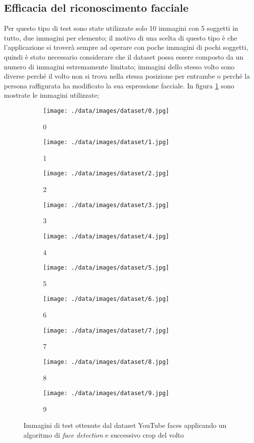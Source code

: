 \subsection{Efficacia del riconoscimento facciale}
Per questo tipo di test sono state utilizzate solo 10 immagini con 5 soggetti in tutto, due immagini per elemento; il motivo di una scelta di questo tipo è che l'applicazione si troverà sempre ad operare con poche immagini di pochi soggetti, quindi è stato necessario considerare che il dataset possa essere composto da un numero di immagini estremamente limitato; immagini dello stesso volto sono diverse perché il volto non si trova nella stessa posizione per entrambe o perché la persona raffigurata ha modificato la sua espressione facciale. In figura \ref{try_images} sono mostrate le immagini utilizzate;
\begin{figure}
	\centering
	\begin{subfigure}{0.2 \textwidth}
		\texttt{[image: ./data/images/dataset/0.jpg]}
		\caption{0}
	\end{subfigure}
	\begin{subfigure}{0.2 \textwidth}
		\texttt{[image: ./data/images/dataset/1.jpg]}
		\caption{1}
	\end{subfigure}
	\begin{subfigure}{0.2 \textwidth}
		\texttt{[image: ./data/images/dataset/2.jpg]}
		\caption{2}
	\end{subfigure}
	\begin{subfigure}{0.2 \textwidth}
		\texttt{[image: ./data/images/dataset/3.jpg]}
		\caption{3}
	\end{subfigure}
	\begin{subfigure}{0.2 \textwidth}
		\texttt{[image: ./data/images/dataset/4.jpg]}
		\caption{4}
	\end{subfigure}
	\begin{subfigure}{0.2 \textwidth}
		\texttt{[image: ./data/images/dataset/5.jpg]}
		\caption{5}
	\end{subfigure}
	\begin{subfigure}{0.2 \textwidth}
		\texttt{[image: ./data/images/dataset/6.jpg]}
		\caption{6}
	\end{subfigure}
	\begin{subfigure}{0.2 \textwidth}
		\texttt{[image: ./data/images/dataset/7.jpg]}
		\caption{7}
	\end{subfigure}
	\begin{subfigure}{0.2 \textwidth}
		\texttt{[image: ./data/images/dataset/8.jpg]}
		\caption{8}
	\end{subfigure}
	\begin{subfigure}{0.2 \textwidth}
		\texttt{[image: ./data/images/dataset/9.jpg]}
		\caption{9}
	\end{subfigure}
	\caption{Immagini di test ottenute dal dataset YouTube faces applicando un algoritmo di \textit{face detection} e successivo crop del volto \cite{wolf2011face}}
	\label{try_images}
\end{figure}
